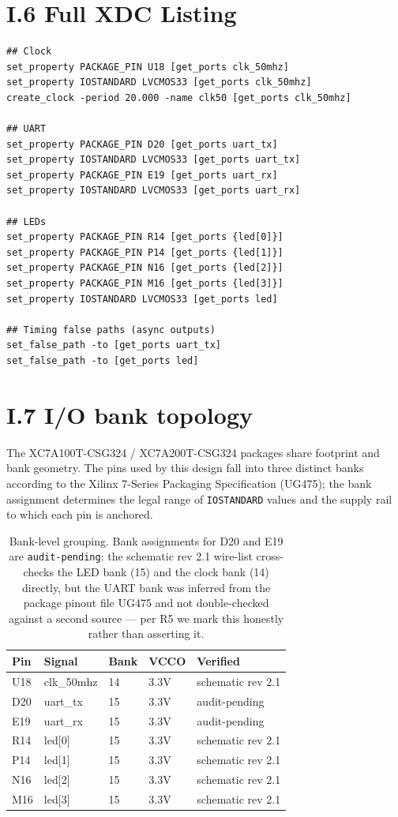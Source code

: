 \section*{I.6 Full XDC Listing}
\label{sec:appI-listing}

\begin{verbatim}
## Clock
set_property PACKAGE_PIN U18 [get_ports clk_50mhz]
set_property IOSTANDARD LVCMOS33 [get_ports clk_50mhz]
create_clock -period 20.000 -name clk50 [get_ports clk_50mhz]

## UART
set_property PACKAGE_PIN D20 [get_ports uart_tx]
set_property IOSTANDARD LVCMOS33 [get_ports uart_tx]
set_property PACKAGE_PIN E19 [get_ports uart_rx]
set_property IOSTANDARD LVCMOS33 [get_ports uart_rx]

## LEDs
set_property PACKAGE_PIN R14 [get_ports {led[0]}]
set_property PACKAGE_PIN P14 [get_ports {led[1]}]
set_property PACKAGE_PIN N16 [get_ports {led[2]}]
set_property PACKAGE_PIN M16 [get_ports {led[3]}]
set_property IOSTANDARD LVCMOS33 [get_ports led]

## Timing false paths (async outputs)
set_false_path -to [get_ports uart_tx]
set_false_path -to [get_ports led]
\end{verbatim}

\section*{I.7 I/O bank topology}
\label{sec:appI-banks}

The XC7A100T-CSG324 / XC7A200T-CSG324 packages share footprint and bank
geometry. The pins used by this design fall into three distinct banks
according to the Xilinx 7-Series Packaging Specification (UG475);
the bank assignment determines the legal range of \texttt{IOSTANDARD}
values and the supply rail to which each pin is anchored.

\begin{table}[h]
\centering
\begin{tabular}{lllll}
\toprule
\textbf{Pin} & \textbf{Signal} & \textbf{Bank} & \textbf{VCCO} & \textbf{Verified} \\
\midrule
U18 & clk\_50mhz & 14 & 3.3V & schematic rev 2.1 \\
D20 & uart\_tx   & 15 & 3.3V & audit-pending \\
E19 & uart\_rx   & 15 & 3.3V & audit-pending \\
R14 & led[0]     & 15 & 3.3V & schematic rev 2.1 \\
P14 & led[1]     & 15 & 3.3V & schematic rev 2.1 \\
N16 & led[2]     & 15 & 3.3V & schematic rev 2.1 \\
M16 & led[3]     & 15 & 3.3V & schematic rev 2.1 \\
\bottomrule
\end{tabular}
\caption{Bank-level grouping. Bank assignments for D20 and E19 are
\texttt{audit-pending}: the schematic rev 2.1 wire-list cross-checks the
LED bank (15) and the clock bank (14) directly, but the UART bank was
inferred from the package pinout file UG475 and not double-checked
against a second source --- per R5 we mark this honestly rather than
asserting it.}
\end{table}

